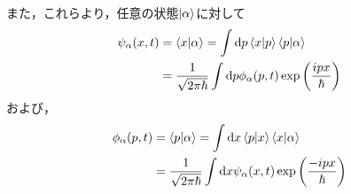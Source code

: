 また，これらより，任意の状態$\ket{\alpha}$に対して
\begin{align}
    \psi_{\alpha}(x,t)&=\braket{x}{\alpha}=\int\mathrm{d} p \braket{x}{p}\braket{p}{\alpha}\\
    &=\frac{1}{\sqrt{2\pi\hbar}}\int\mathrm{d} p\phi_{\alpha}(p,t)\exp\qty(\frac{ipx}{\hbar})
\end{align}
および，
\begin{align}
    \phi_{\alpha}(p,t)&=\braket{p}{\alpha}=\int\mathrm{d} x \braket{p}{x}\braket{x}{\alpha}\\
    &=\frac{1}{\sqrt{2\pi\hbar}}\int\mathrm{d} x\psi_{\alpha}(x,t)\exp\qty(\frac{-ipx}{\hbar})
\end{align}
